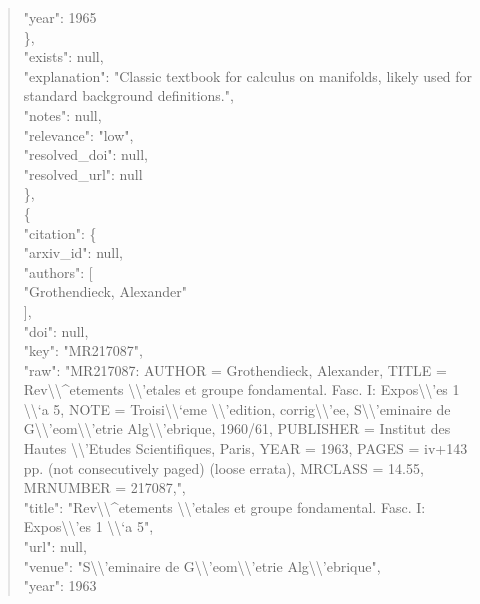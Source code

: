 \documentclass[11pt]{article}
\begin{document}
\begin{quote}
        "year": 1965\\
      \},\\
      "exists": null,\\
      "explanation": "Classic textbook for calculus on manifolds, likely used for standard background definitions.",\\
      "notes": null,\\
      "relevance": "low",\\
      "resolved\_doi": null,\\
      "resolved\_url": null\\
    \},\\
    \{\\
      "citation": \{\\
        "arxiv\_id": null,\\
        "authors": [\\
          "Grothendieck, Alexander"\\
        ],\\
        "doi": null,\\
        "key": "MR217087",\\
        "raw": "MR217087: AUTHOR = Grothendieck, Alexander, TITLE = Rev\textbackslash{}\textbackslash{}\^{}etements \textbackslash{}\textbackslash{}'etales et groupe fondamental. Fasc. I: Expos\textbackslash{}\textbackslash{}'es 1 \textbackslash{}\textbackslash{}`a 5, NOTE = Troisi\textbackslash{}\textbackslash{}`eme \textbackslash{}\textbackslash{}'edition, corrig\textbackslash{}\textbackslash{}'ee, S\textbackslash{}\textbackslash{}'eminaire de G\textbackslash{}\textbackslash{}'eom\textbackslash{}\textbackslash{}'etrie Alg\textbackslash{}\textbackslash{}'ebrique, 1960/61, PUBLISHER = Institut des Hautes \textbackslash{}\textbackslash{}'Etudes Scientifiques, Paris, YEAR = 1963, PAGES = iv+143 pp. (not consecutively paged) (loose errata), MRCLASS = 14.55, MRNUMBER = 217087,",\\
        "title": "Rev\textbackslash{}\textbackslash{}\^{}etements \textbackslash{}\textbackslash{}'etales et groupe fondamental. Fasc. I: Expos\textbackslash{}\textbackslash{}'es 1 \textbackslash{}\textbackslash{}`a 5",\\
        "url": null,\\
        "venue": "S\textbackslash{}\textbackslash{}'eminaire de G\textbackslash{}\textbackslash{}'eom\textbackslash{}\textbackslash{}'etrie Alg\textbackslash{}\textbackslash{}'ebrique",\\
        "year": 1963\\

\end{quote}
\end{document}
